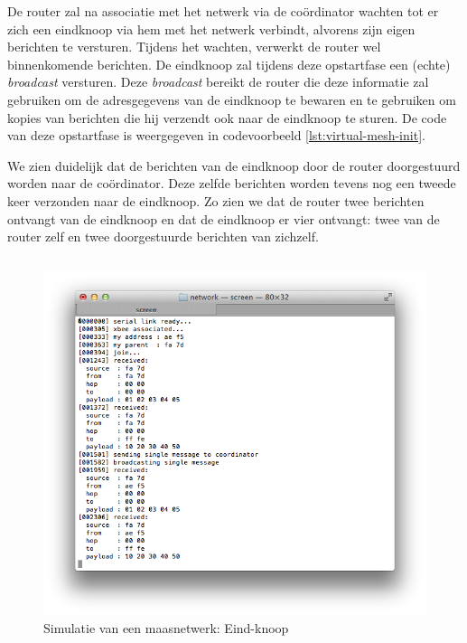 De router zal na associatie met het netwerk via de co\"ordinator wachten tot er
zich een eindknoop via hem met het netwerk verbindt, alvorens zijn eigen
berichten te versturen. Tijdens het wachten, verwerkt de router wel
binnenkomende berichten. De eindknoop zal tijdens deze opstartfase een (echte)
\emph{broadcast} versturen. Deze \emph{broadcast} bereikt de router die deze
informatie zal gebruiken om de adresgegevens van de eindknoop te bewaren en te
gebruiken om kopies van berichten die hij verzendt ook naar de eindknoop te
sturen. De code van deze opstartfase is weergegeven in codevoorbeeld
\ref{lst:virtual-mesh-init}.

We zien duidelijk dat de berichten van de eindknoop door de router doorgestuurd
worden naar de co\"ordinator. Deze zelfde berichten worden tevens nog een
tweede keer verzonden naar de eindknoop. Zo zien we dat de router twee
berichten ontvangt van de eindknoop en dat de eindknoop er vier ontvangt: twee
van de router zelf en twee doorgestuurde berichten van zichzelf.

\inputminted[linenos,frame=lines,framesep=2mm,fontsize=\footnotesize,firstline=37,lastline=60,firstnumber=37]{c}{../src/demo/lib/network.c}
\vspace{-5mm}
\vspace{3mm}

\begin{figure}[ht]
  \centering
  \includegraphics[width=.7\linewidth]{../src/demo/network/end-device.png}
  \vspace{-3mm}
  \caption{Simulatie van een maasnetwerk: Eind-knoop}
  \label{fig:virtual-mesh-end-device}
\end{figure}

